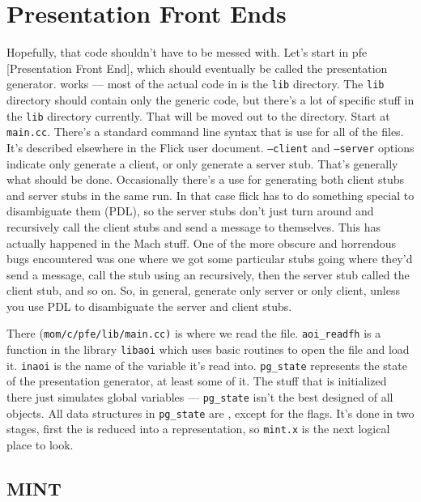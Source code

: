 \section{Presentation Front Ends}

Hopefully, that code shouldn't have to be messed with.  Let's start in pfe
[Presentation Front End], which should eventually be called the presentation
generator.  \CORBA{} works --- most of the actual code in is the \texttt{lib}
directory.  The \texttt{lib} directory should contain only the generic code,
but there's a lot of \CORBA{} specific stuff in the \texttt{lib} directory
currently.  That will be moved out to the \CORBA{} directory.  Start at
\texttt{main.cc}.  There's a standard command line syntax that is use for all
of the files.  It's described elsewhere in the Flick user document.
\texttt{--client} and \texttt{--server} options indicate only generate a
client, or only generate a server stub.  That's generally what should be done.
Occasionally there's a use for generating both client stubs and server stubs in
the same run.  In that case flick has to do something special to disambiguate
them (PDL), so the server stubs don't just turn around and recursively call the
client stubs and send a message to themselves.  This has actually happened in
the Mach stuff.  One of the more obscure and horrendous bugs encountered was
one where we got some particular stubs going where they'd send a message, call
the stub using an \RPC{} recursively, then the server stub called the client stub,
and so on.  So, in general, generate only server or only client, unless you use
PDL to disambiguate the server and client stubs.

There (\texttt{mom/c/pfe/lib/main.cc)} is where we read the \AOI{} file.
\texttt{aoi\_readfh} is a function in the library \texttt{libaoi} which uses
basic \XDR{} routines to open the \AOI{} file and load it.  \texttt{inaoi} is the
name of the variable it's read into.  \texttt{pg\_state} represents the state
of the presentation generator, at least some of it.  The stuff that is
initialized there just simulates global variables --- \texttt{pg\_state} isn't
the best designed of all objects.  All data structures in \texttt{pg\_state}
are \XDR{}, except for the flags.  It's done in two stages, first the \AOI{} is
reduced into a \MINT{} representation, so \texttt{mint.x} is the next logical
place to look.


\subsection{MINT}

